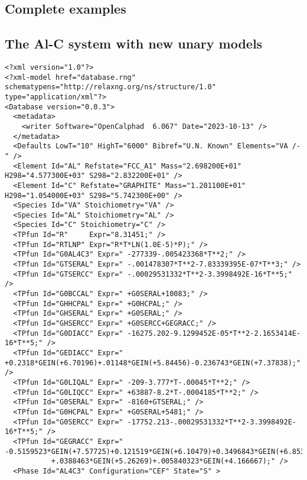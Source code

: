 \documentclass{article}
\begin{document}
\begin{appendices}
\newpage

\setcounter{equation}{0}
\renewcommand{\theequation}{D\arabic{equation}}
\setcounter{figure}{0}
\renewcommand{\thefigure}{D\arabic{figure}}

\section{Complete examples}

\subsection{The Al-C system with new unary models}\label{sec:alc}

{\small
\begin{verbatim}
<?xml version="1.0"?>
<?xml-model href="database.rng" schematypens="http://relaxng.org/ns/structure/1.0" type="application/xml"?>
<Database version="0.0.3">
  <metadata>
    <writer Software="OpenCalphad  6.067" Date="2023-10-13" />
  </metadata>
  <Defaults LowT="10" HighT="6000" Bibref="U.N. Known" Elements="VA /-" />
  <Element Id="AL" Refstate="FCC_A1" Mass="2.698200E+01" H298="4.577300E+03" S298="2.832200E+01" />
  <Element Id="C" Refstate="GRAPHITE" Mass="1.201100E+01" H298="1.054000E+03" S298="5.742300E+00" />
  <Species Id="VA" Stoichiometry="VA" />
  <Species Id="AL" Stoichiometry="AL" />
  <Species Id="C" Stoichiometry="C" />
  <TPfun Id="R"     Expr="8.31451;" />
  <TPfun Id="RTLNP" Expr="R*T*LN(1.0E-5)*P);" />
  <TPfun Id="G0AL4C3" Expr=" -277339-.005423368*T**2;" /> 
  <TPfun Id="GTSERAL" Expr=" -.001478307*T**2-7.83339395E-07*T**3;" /> 
  <TPfun Id="GTSERCC" Expr=" -.00029531332*T**2-3.3998492E-16*T**5;" /> 
  <TPfun Id="G0BCCAL" Expr=" +G0SERAL+10083;" /> 
  <TPfun Id="GHHCPAL" Expr=" +G0HCPAL;" /> 
  <TPfun Id="GHSERAL" Expr=" +G0SERAL;" /> 
  <TPfun Id="GHSERCC" Expr=" +G0SERCC+GEGRACC;" /> 
  <TPfun Id="G0DIACC" Expr=" -16275.202-9.1299452E-05*T**2-2.1653414E-16*T**5;" /> 
  <TPfun Id="GEDIACC" Expr=" +0.2318*GEIN(+6.70196)+.01148*GEIN(+5.84456)-0.236743*GEIN(+7.37838);" /> 
  <TPfun Id="G0LIQAL" Expr=" -209-3.777*T-.00045*T**2;" /> 
  <TPfun Id="G0LIQCC" Expr=" +63887-8.2*T-.0004185*T**2;" /> 
  <TPfun Id="G0SERAL" Expr=" -8160+GTSERAL;" /> 
  <TPfun Id="G0HCPAL" Expr=" +G0SERAL+5481;" /> 
  <TPfun Id="G0SERCC" Expr=" -17752.213-.00029531332*T**2-3.3998492E-16*T**5;" /> 
  <TPfun Id="GEGRACC" Expr=" -0.5159523*GEIN(+7.57725)+0.121519*GEIN(+6.10479)+0.3496843*GEIN(+6.8533)
           +.0388463*GEIN(+5.26269)+.005840323*GEIN(+4.166667);" /> 
  <Phase Id="AL4C3" Configuration="CEF" State="S" >

\end{verbatim}}
\end{appendices}
\end{document}
